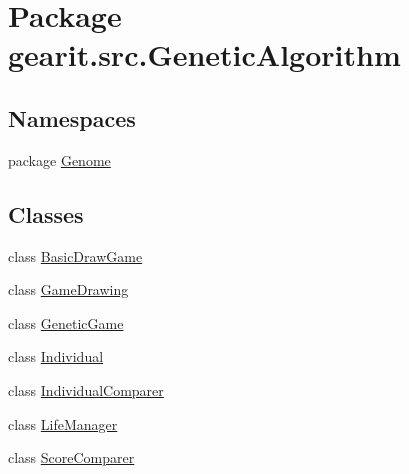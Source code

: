 \hypertarget{namespacegearit_1_1src_1_1_genetic_algorithm}{\section{Package gearit.\+src.\+Genetic\+Algorithm}
\label{namespacegearit_1_1src_1_1_genetic_algorithm}
}
\subsection*{Namespaces}
\begin{DoxyCompactItemize}
\item 
package \hyperlink{namespacegearit_1_1src_1_1_genetic_algorithm_1_1_genome}{Genome}
\end{DoxyCompactItemize}
\subsection*{Classes}
\begin{DoxyCompactItemize}
\item 
class \hyperlink{classgearit_1_1src_1_1_genetic_algorithm_1_1_basic_draw_game}{Basic\+Draw\+Game}
\item 
class \hyperlink{classgearit_1_1src_1_1_genetic_algorithm_1_1_game_drawing}{Game\+Drawing}
\item 
class \hyperlink{classgearit_1_1src_1_1_genetic_algorithm_1_1_genetic_game}{Genetic\+Game}
\item 
class \hyperlink{classgearit_1_1src_1_1_genetic_algorithm_1_1_individual}{Individual}
\item 
class \hyperlink{classgearit_1_1src_1_1_genetic_algorithm_1_1_individual_comparer}{Individual\+Comparer}
\item 
class \hyperlink{classgearit_1_1src_1_1_genetic_algorithm_1_1_life_manager}{Life\+Manager}
\item 
class \hyperlink{classgearit_1_1src_1_1_genetic_algorithm_1_1_score_comparer}{Score\+Comparer}
\end{DoxyCompactItemize}
